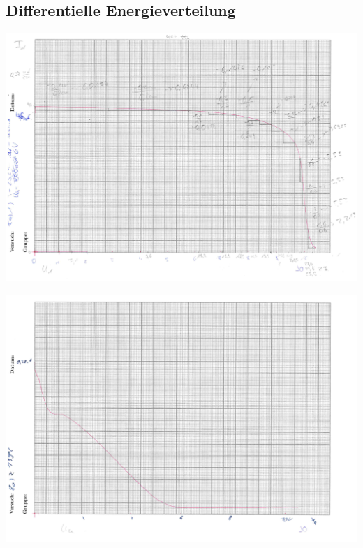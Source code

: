 \subsection{Differentielle Energieverteilung}
\begin{landscape}
\includegraphics[page = 1, scale = 0.8]{8a1.pdf}
\label{fig:8a1}
\end{landscape}
\begin{landscape}
\includegraphics[page = 1, scale = 0.8]{8a2.pdf}
\label{fig:8a2}
\end{landscape}

